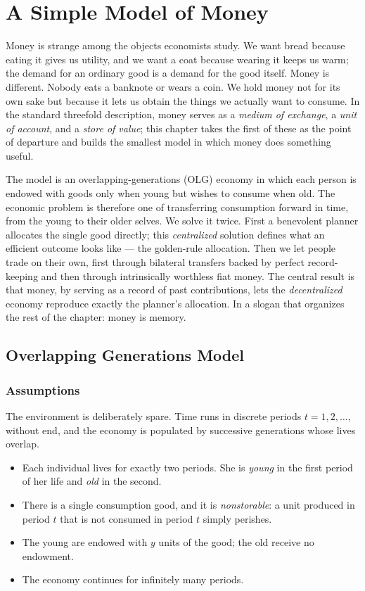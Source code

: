 \chapter{A Simple Model of Money}
\label{ch:money-model}

Money is strange among the objects economists study. We want bread because eating it gives us utility, and we want a coat because wearing it keeps us warm; the demand for an ordinary good is a demand for the good itself. Money is different. Nobody eats a banknote or wears a coin. We hold money not for its own sake but because it lets us obtain the things we actually want to consume. In the standard threefold description, money serves as a \emph{medium of exchange}, a \emph{unit of account}, and a \emph{store of value}; this chapter takes the first of these as the point of departure and builds the smallest model in which money does something useful.

The model is an overlapping-generations (OLG) economy in which each person is endowed with goods only when young but wishes to consume when old. The economic problem is therefore one of transferring consumption forward in time, from the young to their older selves. We solve it twice. First a benevolent planner allocates the single good directly; this \emph{centralized} solution defines what an efficient outcome looks like --- the golden-rule allocation. Then we let people trade on their own, first through bilateral transfers backed by perfect record-keeping and then through intrinsically worthless fiat money. The central result is that money, by serving as a record of past contributions, lets the \emph{decentralized} economy reproduce exactly the planner's allocation. In a slogan that organizes the rest of the chapter: money is memory.

\section{Overlapping Generations Model}

\subsection{Assumptions}

The environment is deliberately spare. Time runs in discrete periods $t = 1, 2, \dots$, without end, and the economy is populated by successive generations whose lives overlap.

\begin{itemize}
    \item Each individual lives for exactly two periods. She is \emph{young} in the first period of her life and \emph{old} in the second.
    \item There is a single consumption good, and it is \emph{nonstorable}: a unit produced in period $t$ that is not consumed in period $t$ simply perishes.
    \item The young are endowed with $y$ units of the good; the old receive no endowment.
    \item The economy continues for infinitely many periods.
\end{itemize}

